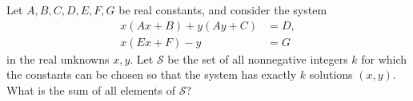 Let $A,B,C,D,E,F,G$ be real constants, and consider the system
\begin{align*}
x(Ax+B)+y(Ay+C)&=D,\\
x(Ex+F)-y&=G
\end{align*}
in the real unknowns $x,y$. Let $\mathcal S$ be the set of all nonnegative integers $k$ for which the constants can be chosen so that the system has exactly $k$ solutions $(x,y)$. What is the sum of all elements of $\mathcal S$?
